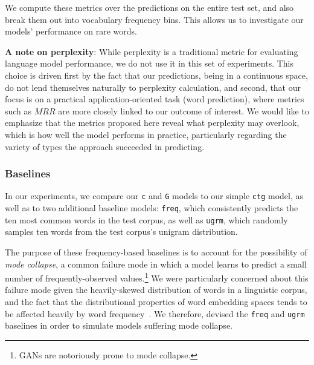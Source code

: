 \documentclass[11pt,a4paper]{article}
\begin{document}
We compute these metrics over the predictions on the entire test set, and also break them out into vocabulary frequency bins. This allows us to investigate our models' performance on rare words.

\noindent
\textbf{A note on perplexity}: While perplexity is a traditional metric for evaluating language model performance, we do not use it in this set of experiments. 
This choice is driven first by the fact that our predictions, being in a continuous space, do not lend themselves naturally to perplexity calculation, and second, that our focus is on a practical application-oriented task (word prediction), where metrics such as $MRR$ are more closely linked to our outcome of interest. 
We would like to emphasize that the metrics proposed here reveal what perplexity may overlook, which is how well the model performs in practice, particularly regarding the variety of types the approach succeeded in predicting. 


\subsubsection{Baselines}

In our experiments, we compare our \texttt{c} and \texttt{G} models to our simple \texttt{ctg} model, as well as to two additional baseline models: \texttt{freq}, which consistently predicts the ten most common words in the test corpus, as well as \texttt{ugrm}, which randomly samples ten words from the test corpus's unigram distribution. 

The purpose of these frequency-based baselines is to account for the possibility of \textit{mode collapse}, a common failure mode in which a model learns to predict a small number of frequently-observed values.\footnote{GANs are notoriously prone to mode collapse.} 
We were particularly concerned about this failure mode given the heavily-skewed distribution of words in a linguistic corpus, and the fact that the distributional properties of word embedding spaces tends to be affected heavily by word frequency~\citep{Gong2018aa}. We therefore, devised the \texttt{freq} and \texttt{ugrm} baselines in order to simulate models suffering mode collapse.

\end{document}

